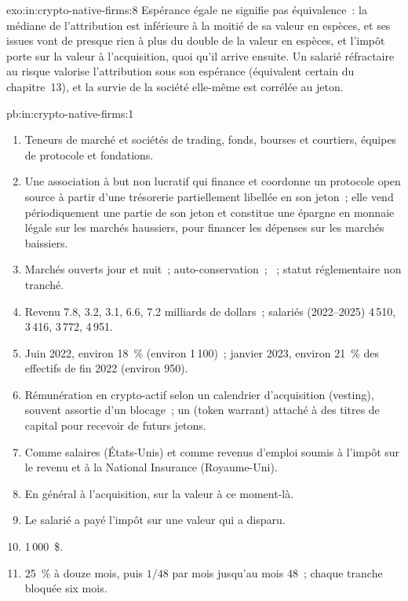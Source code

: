 \begin{solution}{exo:in:crypto-native-firms:8}
Espérance égale ne signifie pas équivalence~: la médiane de l'attribution est inférieure à la moitié de sa valeur en espèces, et ses issues vont de
presque rien à plus du double de la valeur en espèces, et l'impôt porte sur la valeur à l'acquisition, quoi qu'il arrive ensuite. Un salarié réfractaire au risque
valorise l'attribution sous son espérance (équivalent certain du chapitre~13), et la survie de la société elle-même est corrélée au
jeton.
\end{solution}

\begin{solution}{pb:in:crypto-native-firms:1}
\begin{enumerate}
\item Teneurs de marché et sociétés de trading, fonds, bourses et courtiers, équipes de protocole et fondations.
\item Une association à but non lucratif qui finance et coordonne un protocole open source à partir d'une trésorerie partiellement libellée en son jeton~; elle vend périodiquement une partie de son
jeton et constitue une épargne en monnaie légale sur les marchés haussiers, pour financer les dépenses sur les marchés baissiers.
\item Marchés ouverts jour et nuit~; auto-conservation~; ~; statut réglementaire non tranché.
\item Revenu 7.8, 3.2, 3.1, 6.6, 7.2 milliards de dollars~; salariés (2022--2025) 4\,510, 3\,416, 3\,772, 4\,951.
\item Juin 2022, environ 18~\% (environ 1\,100)~; janvier 2023, environ 21~\% des effectifs de fin 2022 (environ 950).
\item Rémunération en crypto-actif selon un calendrier d'acquisition (vesting), souvent assortie d'un blocage~; un  (token warrant) attaché à des titres de capital pour recevoir de futurs
jetons.
\item Comme salaires (États-Unis) et comme revenus d'emploi soumis à l'impôt sur le revenu et à la National Insurance (Royaume-Uni).
\item En général à l'acquisition, sur la valeur à ce moment-là.
\item Le salarié a payé l'impôt sur une valeur qui a disparu.
\item 1\,000~\$.
\item 25~\% à douze mois, puis $1/48$ par mois jusqu'au mois 48~; chaque tranche bloquée six mois.

\end{enumerate}
\end{solution}
